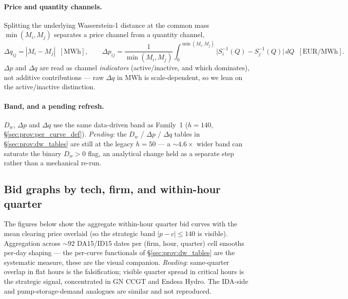 \documentclass[11pt,a4paper]{article}
\begin{document}
\paragraph{Price and quantity channels.} Splitting the underlying Wasserstein-1 distance at the common mass $\min(M_i,M_j)$ separates a price channel from a quantity channel,
\[
 \Delta q_{ij} = |M_i - M_j|\;\;[\text{MWh}],
 \qquad
 \Delta p_{ij} = \frac{1}{\min(M_i, M_j)}\int_{0}^{\min(M_i, M_j)}\!\!\big|S_i^{-1}(Q) - S_j^{-1}(Q)\big|\,dQ\;\;[\text{EUR/MWh}].
\]
$\Delta p$ and $\Delta q$ are read as channel \emph{indicators} (active/inactive, and which dominates), not additive contributions --- raw $\Delta q$ in MWh is scale-dependent, so we lean on the active/inactive distinction.

\paragraph{Band, and a pending refresh.} $D_w$, $\Delta p$ and $\Delta q$ use the same data-driven band as Family~1 ($h = 140$, \S\ref{sec:prov:per_curve_def}). \emph{Pending:} the $D_w$ / $\Delta p$ / $\Delta q$ tables in \S\ref{sec:prov:dw_tables} are still at the legacy $h = 50$ --- a $\sim 4.6\times$ wider band can saturate the binary $D_w>0$ flag, an analytical change held as a separate step rather than a mechanical re-run.

\subsection{Bid graphs by tech, firm, and within-hour quarter}\label{sec:prov:bid_graphs}

\noindent The figures below show the aggregate within-hour quarter bid curves with the mean clearing price overlaid (so the strategic band $|p-c|\le 140$ is visible). Aggregation across $\sim 92$ DA15/ID15 dates per (firm, hour, quarter) cell smooths per-day shaping --- the per-curve functionals of \S\ref{sec:prov:dw_tables} are the systematic measure, these are the visual companion. \emph{Reading}: same-quarter overlap in flat hours is the falsification; visible quarter spread in critical hours is the strategic signal, concentrated in GN CCGT and Endesa Hydro. The IDA-side and pump-storage-demand analogues are similar and not reproduced.
\end{document}
